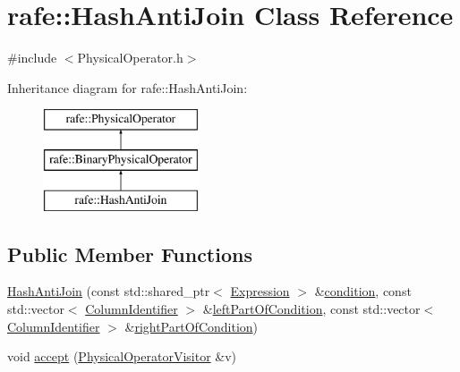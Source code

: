 \hypertarget{classrafe_1_1_hash_anti_join}{\section{rafe\+:\+:Hash\+Anti\+Join Class Reference}
\label{classrafe_1_1_hash_anti_join}
}


{\ttfamily \#include $<$Physical\+Operator.\+h$>$}

Inheritance diagram for rafe\+:\+:Hash\+Anti\+Join\+:\begin{figure}[H]
\begin{center}
\leavevmode
\includegraphics[height=3.000000cm]{classrafe_1_1_hash_anti_join}
\end{center}
\end{figure}
\subsection*{Public Member Functions}
\begin{DoxyCompactItemize}
\item 
\hyperlink{classrafe_1_1_hash_anti_join_a1682f3847d042fe0c3ed5782d94f972d}{Hash\+Anti\+Join} (const std\+::shared\+\_\+ptr$<$ \hyperlink{classrafe_1_1_expression}{Expression} $>$ \&\hyperlink{classrafe_1_1_hash_anti_join_a23275305fdc386ac5cd85a72e3cf35b5}{condition}, const std\+::vector$<$ \hyperlink{classrafe_1_1_column_identifier}{Column\+Identifier} $>$ \&\hyperlink{classrafe_1_1_hash_anti_join_aee96d4c1b6379eddfce548a5ad0733f0}{left\+Part\+Of\+Condition}, const std\+::vector$<$ \hyperlink{classrafe_1_1_column_identifier}{Column\+Identifier} $>$ \&\hyperlink{classrafe_1_1_hash_anti_join_a3d1f9f90ff58e9af2c24cf432a5c8508}{right\+Part\+Of\+Condition})
\item 
void \hyperlink{classrafe_1_1_hash_anti_join_a3df56df88dd2e9280d6243cba23b4ac4}{accept} (\hyperlink{classrafe_1_1_physical_operator_visitor}{Physical\+Operator\+Visitor} \&v)
\end{DoxyCompactItemize}
